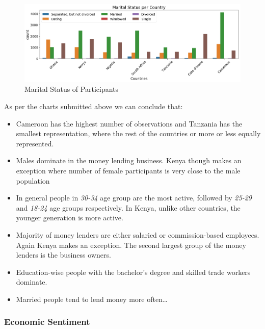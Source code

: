 \begin{Schunk}
\begin{figure}[H]

{\centering \includegraphics[width=1.15\linewidth]{../../artifacts/participant_marital} 

}

\caption[Marital Status of Participants]{Marital Status of Participants}\label{fig:pms}
\end{figure}
\end{Schunk}

As per the charts submitted above we can conclude that:

\begin{itemize}
\tightlist
\item
  Cameroon has the highest number of observations and Tanzania has the
  smallest representation, where the rest of the countries or more or
  less equally represented.
\item
  Males dominate in the money lending business. Kenya though makes an
  exception where number of female participants is very close to the
  male population
\item
  In general people in \emph{30-34} age group are the most active,
  followed by \emph{25-29} and \emph{18-24} age groups respectively. In
  Kenya, unlike other countries, the younger generation is more active.
\item
  Majority of money lenders are either salaried or commission-based
  employees. Again Kenya makes an exception. The second largest group of
  the money lenders is the business owners.
\item
  Education-wise people with the bachelor's degree and skilled trade
  workers dominate.
\item
  Married people tend to lend money more often\ldots{}
\end{itemize}

\hypertarget{economic-sentiment}{%
\subsubsection{Economic Sentiment}\label{economic-sentiment}}

